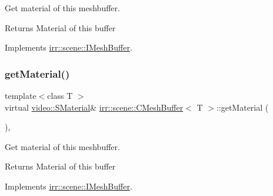Get material of this meshbuffer. 

\begin{DoxyReturn}{Returns}
Material of this buffer 
\end{DoxyReturn}


Implements \hyperlink{classirr_1_1scene_1_1IMeshBuffer_a26fd922f00fde56abbbbbe40b485238b}{irr\+::scene\+::\+I\+Mesh\+Buffer}.

\mbox{\label{classirr_1_1scene_1_1CMeshBuffer_af69e8356b4525a3fee1ddbf188d81e8a}} 
\subsubsection{\texorpdfstring{get\+Material()}{getMaterial()}\hspace{0.1cm}{\footnotesize\ttfamily [4/4]}}
{\footnotesize\ttfamily template$<$class T $>$ \\
virtual \hyperlink{classirr_1_1video_1_1SMaterial}{video\+::\+S\+Material}\& \hyperlink{classirr_1_1scene_1_1CMeshBuffer}{irr\+::scene\+::\+C\+Mesh\+Buffer}$<$ T $>$\+::get\+Material (\begin{DoxyParamCaption}{ }\end{DoxyParamCaption})\hspace{0.3cm}{\ttfamily [inline]}, {\ttfamily [virtual]}}



Get material of this meshbuffer. 

\begin{DoxyReturn}{Returns}
Material of this buffer 
\end{DoxyReturn}


Implements \hyperlink{classirr_1_1scene_1_1IMeshBuffer_a26fd922f00fde56abbbbbe40b485238b}{irr\+::scene\+::\+I\+Mesh\+Buffer}.

\mbox{\label{classirr_1_1scene_1_1CMeshBuffer_a72ee778498eff327a20c6be179976994}} 
